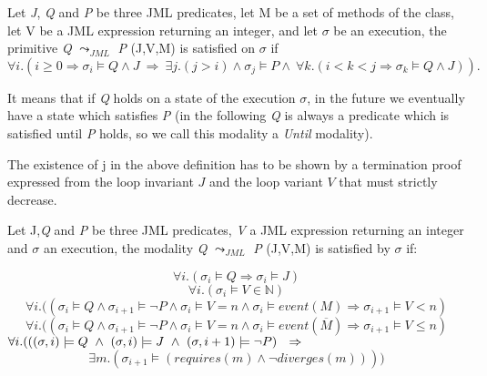 \begin{definition}\label{until1} Let \textit{J}, \emph{Q} and \emph{P} be three JML predicates, let M be a set of methods of the class, let V be a JML expression returning an integer, and let $\sigma$ be an execution, the primitive \emph{Q} $\leadsto_{JML}$ \emph{P} (J,V,M) is satisfied on $\sigma$ if
$$ \forall i. (i \geq 0 \Rightarrow \sigma_i \models  Q \wedge J ~ \Rightarrow ~ \exists j. (j > i) \wedge \sigma_j \models  P  \wedge ~\forall k.(i<k<j \Rightarrow \sigma_k \models Q \wedge J)).$$
\end{definition}

It means that if \emph{Q} holds on a state of the execution $\sigma$, in the future we eventually have a state which satisfies \emph{P} (in the following \emph{Q} is always a predicate which is satisfied until \emph{P} holds, so we call this modality a \emph{Until} modality).



The existence of j in the above definition has to be shown by a termination proof expressed from the loop invariant $J$ and the loop variant $V$ that must strictly decrease.


\begin{definition} 
\label{until}
Let J,\textit{Q} and \textit{P} be three JML predicates, \textit{V} a JML expression returning an integer and  $\sigma$ an execution, the modality \textit{Q} $\leadsto_{JML}$ \textit{P} (J,V,M) is satisfied by $\sigma$ if:


\begin{equation}
\forall i.(\sigma_i \models  Q  \Rightarrow \sigma_i \models J )
\end{equation}
\begin{equation}
\forall i.(\sigma_i \models V \in \mathbb{N})
\end{equation}
\begin{equation}
\forall i.((\sigma_i \models  Q  \wedge \sigma_{i+1} \models \neg  P  \wedge \sigma_i \models V = n \wedge \sigma_i \models event(M) \Rightarrow \sigma_{i+1} \models V < n)
\end{equation}
\begin{equation}
\forall i.((\sigma_i \models  Q  \wedge \sigma_{i+1} \models \neg  P  \wedge \sigma_i \models V = n \wedge \sigma_i \models event(\overline{M}) \Rightarrow \sigma_{i+1} \models V \leq n)
\end{equation}
$\forall i.(((\sigma,i) \models Q ~ \wedge ~ (\sigma,i) \models J  ~\wedge ~ (\sigma,i+1) \models \neg  P )~ \mbox{\\} ~ \Rightarrow  ~ $
\begin{equation}
 \exists m.(\sigma_{i+1} \models (requires(m) \wedge \neg diverges(m))))
\end{equation}

\end{definition}

